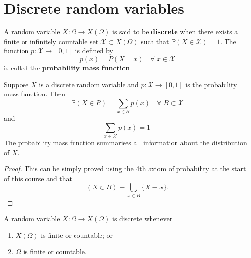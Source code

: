 \section{Discrete random variables}

\begin{definition}
    A random variable $X : \Omega \to X(\Omega)$ is said to be \textbf{discrete} when there exists a finite or infinitely countable set $\mathcal X \subset X(\Omega)$ such that $\mathbb P(X \in \mathcal X) = 1$. The function $p : \mathcal X \to [0, 1]$ is defined by \[ p(x) = P(X = x) \quad \forall \; x \in \mathcal X \] is called the \textbf{probability mass function}.
\end{definition}

\begin{theorem}
    Suppose $X$ is a discrete random variable and $p : \mathcal X \to [0, 1]$ is the probability mass function. Then \[ \mathbb P(X \in B) = \sum_{x \in B} p(x) \quad \forall \; B \subset \mathcal X \] and \[ \sum_{x \in \mathcal X} p(x) = 1. \] The probability mass function summarises all information about the distribution of $X$.
\end{theorem}

\begin{proof}
    This can be simply proved using the 4th axiom of probability at the start of this course and that \[ (X \in B) = \bigcup_{x \in B} \{ X = x \}. \]
\end{proof}

\begin{theorem}
    A random variable $X : \Omega \to X(\Omega)$ is discrete whenever
    \begin{enumerate}
        \item $X(\Omega)$ is finite or countable; or
        \item $\Omega$ is finite or countable.
    \end{enumerate}
\end{theorem}

